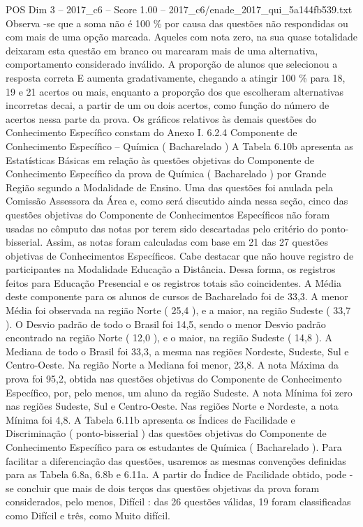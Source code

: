 \begin{textsample}{POS Dim 3 – 2017\_c6 – Score 1.00 – 2017\_c6/enade\_2017\_qui\_5a144fb539.txt}
Observa -se que a soma não é 100 \% por causa das questões não respondidas ou com mais de uma opção marcada.
Aqueles com nota zero, na sua quase totalidade deixaram esta questão em branco ou marcaram mais de uma alternativa, comportamento considerado inválido.
A proporção de alunos que selecionou a resposta correta E aumenta gradativamente, chegando a atingir 100 \% para 18, 19 e 21 acertos ou mais, enquanto a proporção dos que escolheram alternativas incorretas decai, a partir de um ou dois acertos, como função do número de acertos nessa parte da prova.
Os gráficos relativos às demais questões do Conhecimento Específico constam do Anexo I. 6.2.4 Componente de Conhecimento Específico – Química ( Bacharelado ) A Tabela 6.10b apresenta as Estatísticas Básicas em relação às questões objetivas do Componente de Conhecimento Específico da prova de Química ( Bacharelado ) por Grande Região segundo a Modalidade de Ensino.
Uma das questões foi anulada pela Comissão Assessora da Área e, como será discutido ainda nessa seção, cinco das questões objetivas do Componente de Conhecimentos Específicos não foram usadas no cômputo das notas por terem sido descartadas pelo critério do ponto-bisserial.
Assim, as notas foram calculadas com base em 21 das 27 questões objetivas de Conhecimentos Específicos.
Cabe destacar que não houve registro de participantes na Modalidade Educação a Distância.
Dessa forma, os registros feitos para Educação Presencial e os registros totais são coincidentes.
A Média deste componente para os alunos de cursos de Bacharelado foi de 33,3.
A menor Média foi observada na região Norte ( 25,4 ), e a maior, na região Sudeste ( 33,7 ).
O Desvio padrão de todo o Brasil foi 14,5, sendo o menor Desvio padrão encontrado na região Norte ( 12,0 ), e o maior, na região Sudeste ( 14,8 ).
A Mediana de todo o Brasil foi 33,3, a mesma nas regiões Nordeste, Sudeste, Sul e Centro-Oeste.
Na região Norte a Mediana foi menor, 23,8.
A nota Máxima da prova foi 95,2, obtida nas questões objetivas do Componente de Conhecimento Específico, por, pelo menos, um aluno da região Sudeste.
A nota Mínima foi zero nas regiões Sudeste, Sul e Centro-Oeste.
Nas regiões Norte e Nordeste, a nota Mínima foi 4,8.
A Tabela 6.11b apresenta os Índices de Facilidade e Discriminação ( ponto-bisserial ) das questões objetivas do Componente de Conhecimento Específico para os estudantes de Química ( Bacharelado ).
Para facilitar a diferenciação das questões, usaremos as mesmas convenções definidas para as Tabela 6.8a, 6.8b e 6.11a.
A partir do Índice de Facilidade obtido, pode -se concluir que mais de dois terços das questões objetivas da prova foram considerados, pelo menos, Difícil : das 26 questões válidas, 19 foram classificadas como Difícil e três, como Muito difícil.

\end{textsample}
